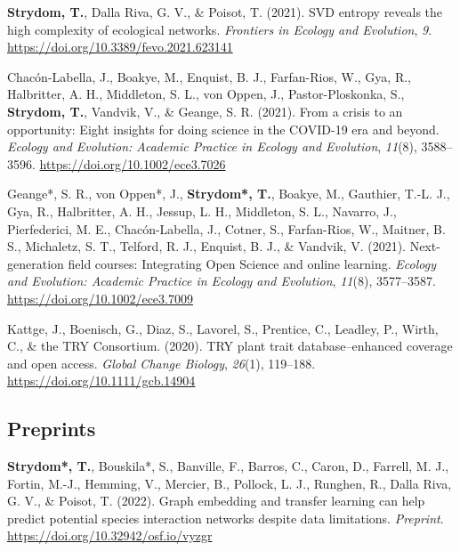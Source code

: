 \documentclass[11pt, a4paper]{awesome-cv}
\begin{document}
\leavevmode{}%
\textbf{Strydom, T.}, Dalla Riva, G. V., \& Poisot, T. (2021). SVD
entropy reveals the high complexity of ecological networks.
\emph{Frontiers in Ecology and Evolution}, \emph{9}.
\url{https://doi.org/10.3389/fevo.2021.623141}

\leavevmode{}%
Chacón-Labella, J., Boakye, M., Enquist, B. J., Farfan-Rios, W., Gya,
R., Halbritter, A. H., Middleton, S. L., von Oppen, J.,
Pastor-Ploskonka, S., \textbf{Strydom, T.}, Vandvik, V., \& Geange, S.
R. (2021). From a crisis to an opportunity: {Eight} insights for doing
science in the {COVID}-19 era and beyond. \emph{Ecology and Evolution:
Academic Practice in Ecology and Evolution}, \emph{11}(8), 3588--3596.
\url{https://doi.org/10.1002/ece3.7026}

\leavevmode{}%
Geange*, S. R., von Oppen*, J., \textbf{Strydom*, T.}, Boakye, M.,
Gauthier, T.-L. J., Gya, R., Halbritter, A. H., Jessup, L. H.,
Middleton, S. L., Navarro, J., Pierfederici, M. E., Chacón-Labella, J.,
Cotner, S., Farfan-Rios, W., Maitner, B. S., Michaletz, S. T., Telford,
R. J., Enquist, B. J., \& Vandvik, V. (2021). Next-generation field
courses: {Integrating Open Science} and online learning. \emph{Ecology
and Evolution: Academic Practice in Ecology and Evolution},
\emph{11}(8), 3577--3587. \url{https://doi.org/10.1002/ece3.7009}

\leavevmode{}%
Kattge, J., Boenisch, G., Diaz, S., Lavorel, S., Prentice, C., Leadley,
P., Wirth, C., \& the TRY Consortium. (2020). TRY plant trait
database--enhanced coverage and open access. \emph{Global Change
Biology}, \emph{26}(1), 119--188.
\url{https://doi.org/10.1111/gcb.14904}

\endgroup
\vspace{\baselineskip}

\hypertarget{preprints}{%
\subsection{\texorpdfstring{\textbf{Preprints}}{Preprints}}\label{preprints}}

\begingroup
\setlength{\parindent}{-0.5in}
\setlength{\leftskip}{0.5in}

\hypertarget{refs_review}{}
\leavevmode{}%
\textbf{Strydom*, T.}, Bouskila*, S., Banville, F., Barros, C., Caron,
D., Farrell, M. J., Fortin, M.-J., Hemming, V., Mercier, B., Pollock, L.
J., Runghen, R., Dalla Riva, G. V., \& Poisot, T. (2022). Graph
embedding and transfer learning can help predict potential species
interaction networks despite data limitations. \emph{Preprint}.
\url{https://doi.org/10.32942/osf.io/vyzgr}
\end{document}
